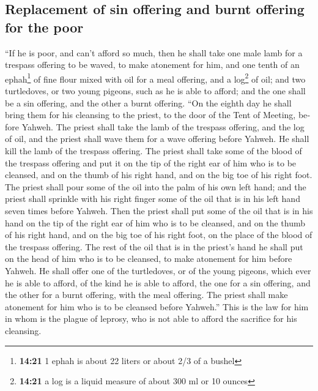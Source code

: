 \begin{paracol}{2}
\begin{otherlanguage}{english}
\hypertarget{replacement-of-sin-offering-and-burnt-offering-for-the-poor}{%
\subsection{Replacement of sin offering and burnt offering for the
poor}\label{replacement-of-sin-offering-and-burnt-offering-for-the-poor}}

 ``If he is poor, and can't afford so much, then he shall
take one male lamb for a trespass offering to be waved, to make
atonement for him, and one tenth of an ephah\footnote{\textbf{14:21} 1
  ephah is about 22 liters or about 2/3 of a bushel} of fine flour mixed
with oil for a meal offering, and a log\footnote{\textbf{14:21} a log is
  a liquid measure of about 300 ml or 10 ounces} of oil; 
and two turtledoves, or two young pigeons, such as he is able to afford;
and the one shall be a sin offering, and the other a burnt offering.
 ``On the eighth day he shall bring them for his
cleansing to the priest, to the door of the Tent of Meeting, before
Yahweh.  The priest shall take the lamb of the trespass
offering, and the log of oil, and the priest shall wave them for a wave
offering before Yahweh.  He shall kill the lamb of the
trespass offering. The priest shall take some of the blood of the
trespass offering and put it on the tip of the right ear of him who is
to be cleansed, and on the thumb of his right hand, and on the big toe
of his right foot.  The priest shall pour some of the oil
into the palm of his own left hand;  and the priest shall
sprinkle with his right finger some of the oil that is in his left hand
seven times before Yahweh.  Then the priest shall put
some of the oil that is in his hand on the tip of the right ear of him
who is to be cleansed, and on the thumb of his right hand, and on the
big toe of his right foot, on the place of the blood of the trespass
offering.  The rest of the oil that is in the priest's
hand he shall put on the head of him who is to be cleansed, to make
atonement for him before Yahweh.  He shall offer one of
the turtledoves, or of the young pigeons, which ever he is able to
afford,  of the kind he is able to afford, the one for a
sin offering, and the other for a burnt offering, with the meal
offering. The priest shall make atonement for him who is to be cleansed
before Yahweh.''  This is the law for him in whom is the
plague of leprosy, who is not able to afford the sacrifice for his
cleansing.


\end{otherlanguage}
\end{paracol}
